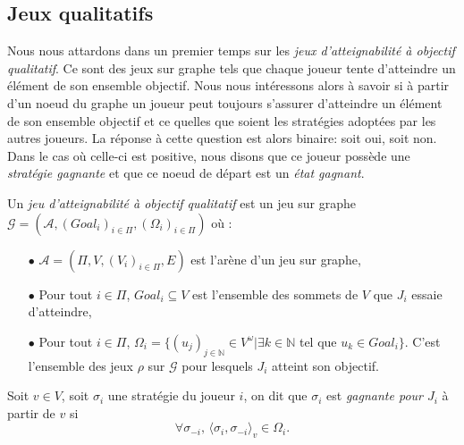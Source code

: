 

\subsection{Jeux qualitatifs}


Nous nous attardons dans un premier temps sur les \emph{jeux d'atteignabilité à objectif qualitatif}. Ce sont des jeux sur graphe tels que chaque joueur tente d'atteindre un élément de son ensemble objectif. Nous nous intéressons alors à savoir si à partir d'un noeud du graphe un joueur peut toujours s'assurer d'atteindre un élément de son ensemble objectif et ce quelles que soient les stratégies adoptées par les autres joueurs. La réponse à cette question est alors binaire: soit oui, soit non. Dans le cas où celle-ci est positive, nous disons que ce joueur possède une \emph{stratégie gagnante} et que ce noeud de départ est un \emph{état gagnant}.
	
	\begin{defi}
		Un \textit{jeu d'atteignabilité à objectif qualitatif} est un jeu sur graphe $\mathcal{G} = (\mathcal{A}, (Goal_{i})_{i \in \Pi},(\Omega _{i})_{i \in \Pi})$ où :
		\begin{enumerate}
			\item[$\bullet$] $\mathcal{A} = (\Pi,V,(V_{i})_{i \in \Pi}, E)$ est l'arène d'un jeu sur graphe,
			\item[$\bullet$] Pour tout $i \in \Pi$, $Goal_{i} \subseteq V $ est l'ensemble des sommets de $V$ que $J_{i}$ essaie d'atteindre,
			\item[$\bullet$] Pour tout $i \in \Pi$, $\Omega _{i} = \{(u_{j})_{j \in \mathbb{N}}\in V^{\omega}| \exists k \in \mathbb{N}$  tel que $u_{k}\in Goal_{i}\}$. C'est l'ensemble des jeux $\rho$ sur $\mathcal{G}$ pour lesquels $J_{i}$ atteint son objectif.
		\end{enumerate}	
	\end{defi}
	
	\label{strategieGagnante}
	\begin{defi}
		Soit $v \in V$, soit $\sigma _{i}$ une stratégie du joueur $i$, on dit que $\sigma _{i}$ est \textit{gagnante pour $J_{i}$} à partir de $v$ si 
		$$ \forall \sigma_{-i}, \, \langle \sigma_i, \sigma_{-i} \rangle_v \in \Omega_i.$$
	\end{defi}
	
